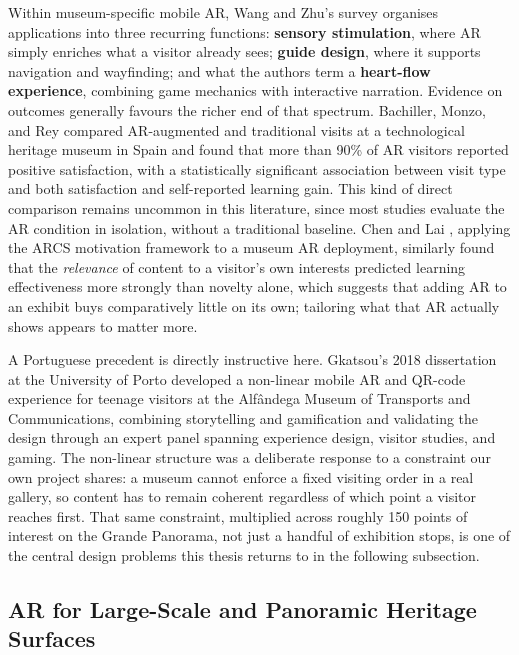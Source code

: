 Within museum-specific mobile AR, Wang and Zhu's survey \cite{wangzhu2022}
organises applications into three recurring functions: \textbf{sensory
stimulation}, where AR simply enriches what a visitor already sees; \textbf{guide
design}, where it supports navigation and wayfinding; and what the authors
term a \textbf{heart-flow experience}, combining game mechanics with interactive
narration. Evidence on outcomes generally favours the richer end of that
spectrum. Bachiller, Monzo, and Rey \cite{bachiller2023} compared
AR-augmented and traditional visits at a technological heritage museum
in Spain and found that more than 90\% of AR visitors reported positive
satisfaction, with a statistically significant association between visit
type and both satisfaction and self-reported learning gain. This kind of
direct comparison remains uncommon in this literature, since most studies
evaluate the AR condition in isolation, without a traditional
baseline. Chen and Lai \cite{chenlai2021}, applying the ARCS motivation
framework to a museum AR deployment, similarly found that the
\emph{relevance} of content to a visitor's own interests predicted
learning effectiveness more strongly than novelty alone, which suggests
that adding AR to an exhibit buys comparatively little on its own;
tailoring what that AR actually shows appears to matter more.

A Portuguese precedent is directly instructive here. Gkatsou's 2018
dissertation at the University of Porto \cite{gkatsou2018} developed a
non-linear mobile AR and QR-code experience for teenage visitors at the
Alf\^{a}ndega Museum of Transports and Communications, combining
storytelling and gamification and validating the design through an
expert panel spanning experience design, visitor studies, and gaming.
The non-linear structure was a deliberate response to a constraint our
own project shares: a museum cannot enforce a fixed visiting order in a
real gallery, so content has to remain coherent regardless of which point
a visitor reaches first. That same constraint, multiplied across roughly
150 points of interest on the Grande Panorama, not just a handful of
exhibition stops, is one of the central design problems this thesis
returns to in the following subsection.









\subsection{AR for Large-Scale and Panoramic Heritage Surfaces}
\label{subsec:rw-large-scale}
 
